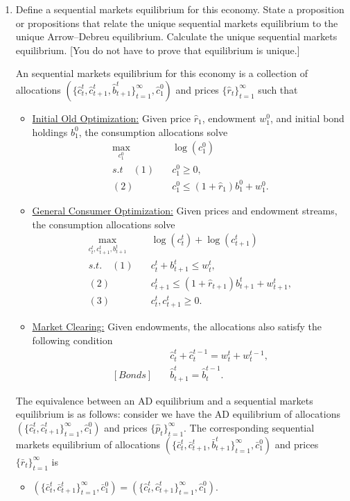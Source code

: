 \documentclass[11pt,english]{article}
\begin{document}
\begin{enumerate}
    \item[b.] Define a sequential markets equilibrium for this economy. State a
        proposition or propositions that relate the unique sequential markets
        equilibrium to the unique Arrow--Debreu equilibrium. Calculate the
        unique sequential markets equilibrium. [You do not have to prove that
        equilibrium is unique.]
    \begin{solution}
  An sequential markets equilibrium for this economy is a collection of allocations $\left(\{\hat{c}_t^t, \hat{c}_{t+1}^t, \hat{b}_{t+1}^t\}_{t=1}^\infty, \hat{c}_1^0\right)$ and prices $\{\hat{r}_t\}_{t=1}^\infty$ such that
\begin{itemize}
\item \underline{Initial Old Optimization:} Given price $\hat{r}_1$, endowment $w_1^0$, and initial bond holdings $b_1^0$, the consumption allocations solve
\begin{align*}
\max_{c_1^0}&\quad \log(c_1^0)\\
s.t\quad (1)&\quad c_1^0 \geq 0,\\
(2)&\quad c_1^0 \leq (1+\hat{r}_1)b_1^0 + w_1^0.
\end{align*}

\item \underline{General Consumer Optimization:} Given prices and endowment streams, the consumption allocations solve
\begin{align*}
\max_{c_t^t, c_{t+1}^t, b_{t+1}^t}&\quad \log(c_t^t) + \log(c_{t+1}^t)\\
s.t.\quad (1)&\quad c_t^t  + b_{t+1}^t \leq w_t^t,\\
(2)&\quad c_{t+1}^t  \leq (1+\hat{r}_{t+1})b_{t+1}^t + w_{t+1}^t,\\
(3)&\quad c_t^t, c_{t+1}^t \geq 0.
\end{align*}

\item \underline{Market Clearing:} Given endowments, the allocations also satisfy the following condition
\begin{align*}
[Goods]&\quad \hat{c}_t^t + \hat{c}_t^{t-1} = w_t^t + w_t^{t-1},\\
[Bonds]&\quad \hat{b}_{t+1}^t = \hat{b}_{t}^{t-1}.
\end{align*}
\end{itemize}

The equivalence between an AD equilibrium and a sequential markets equilibrium is as follows: consider we have the AD equilibrium of allocations $\left(\{\hat{c}_t^t, \hat{c}_{t+1}^t\}_{t=1}^\infty, \hat{c}_1^0\right)$ and prices $\{\hat{p}_t\}_{t=1}^\infty$. The corresponding sequential markets equilibrium of allocations $\left(\{\bar{c}_t^t, \bar{c}_{t+1}^t, \bar{b}_{t+1}^t\}_{t=1}^\infty, \bar{c}_1^0\right)$ and prices $\{\bar{r}_t\}_{t=1}^\infty$ is
\begin{itemize}
\item $\left(\{\bar{c}_t^t, \bar{c}_{t+1}^t\}_{t=1}^\infty, \bar{c}_1^0\right) = \left(\{\hat{c}_t^t, \hat{c}_{t+1}^t\}_{t=1}^\infty, \hat{c}_1^0\right)$.


\end{itemize}
\end{solution}
\end{enumerate}
\end{document}
